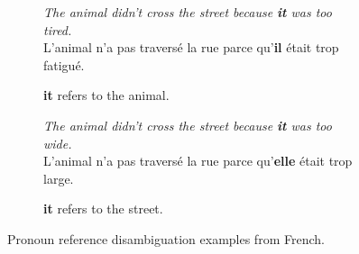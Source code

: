 \begin{figure}[ht]
    \centering
    \begin{subfigure}{0.9\textwidth}
        \centering
        \begin{minipage}{\textwidth}
            \textit{The animal didn't cross the street because \textbf{it} was too tired.}\\
            L'animal n'a pas traversé la rue parce qu'\textbf{il} était trop fatigué.
        \end{minipage}
        \caption{\textbf{it} refers to the animal.}
    \end{subfigure}

    \medskip

    \begin{subfigure}{0.9\textwidth}
        \centering
        \begin{minipage}{\textwidth}
            \textit{The animal didn't cross the street because \textbf{it} was too wide.}\\
            L'animal n'a pas traversé la rue parce qu'\textbf{elle} était trop large.
        \end{minipage}
        \caption{\textbf{it} refers to the street.}
    \end{subfigure}

    \label{fig:attref}
    \caption{Pronoun reference disambiguation examples from French.}
\end{figure}
